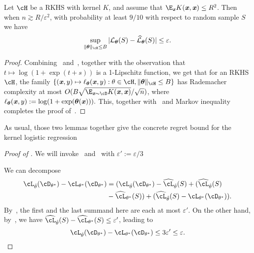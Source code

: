\begin{lemma}
\label{lem:kernel-log-regression-generalization}
    Let $\cH$ be a RKHS with kernel $K$, and assume that $\E_{\xx} K(\xx,\xx) \leq R^2$. Then when $n \gtrsim R/\varepsilon^2$, with probability at least $9/10$ with respect to random sample $S$ we have
    \begin{equation*}
        \sup_{\|\boldsymbol{\theta}\|_{\cH} \leq B} |\mathcal{L}_{\boldsymbol{\theta}}(S) - \widehat{\mathcal{L}}_{\boldsymbol{\theta}}(S)| \leq \varepsilon.
    \end{equation*}
\end{lemma}
\begin{proof}
Combining~ and~, together with the observation that $t \mapsto \log(1 + \exp(t + s))$ is a 1-Lipschitz function, we get that for an RKHS $\cH$, the family $\{ (\xx, y) \mapsto \ell_{\boldsymbol{\theta}}(\xx, y) : \theta \in \cH, \|\boldsymbol{\theta}\|_{\cH} \leq B\}$ has Rademacher complexity at most $O(B\sqrt{\E_{\xx \sim \cD} K(\xx, \xx)} / \sqrt{n})$, where $\ell_{\boldsymbol{\theta}}(\boldsymbol{\mathit{x}}, y) := \log (1 + \exp(\boldsymbol{\theta}(\boldsymbol{\mathit{x}}))).$ 
This, together with~ and Markov inequality completes the proof of~.
\end{proof}


As usual, those two lemmas together give the concrete regret bound for the kernel logistic regression

\begin{proof}[Proof of ]
We will invoke~ and~ with $\varepsilon' := \varepsilon/3$

We can decompose
\begin{align*}
      \cL_{\hat{\theta}}(\cD_{\theta^*}) - \cL_{\theta^*}(\cD_{\theta^*}) & = (\cL_{\hat{\theta}}(\cD_{\theta^*}) - \widehat{\cL}_{\hat{\theta}}(S) + (\widehat{\cL}_{\hat{\theta}}(S) \\
      & - \widehat{\cL}_{\theta^*}(S)) + (\widehat{\cL}_{\hat{\theta}}(S) - \cL_{\theta^*}(\cD_{\theta^*})).
\end{align*}
By~, the first and the last summand here are each at most $\varepsilon'$. On the other hand, by~, we have $\widehat{\cL}_{\hat{\theta}}(S) - \widehat{\cL}_{\theta^*}(S) \leq \varepsilon'$, leading to
\begin{equation*}
    \cL_{\hat{\theta}}(\cD_{\theta^*}) - \cL_{\theta^*}(\cD_{\theta^*}) \leq 3 \varepsilon' \leq \varepsilon.
\end{equation*}
\end{proof}

